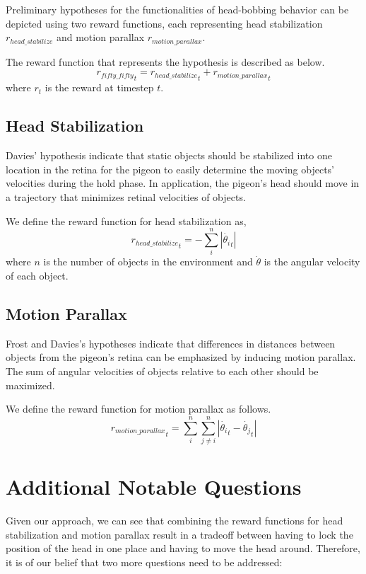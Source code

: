   Preliminary hypotheses for the functionalities of head-bobbing behavior can be depicted using two reward functions, each representing head stabilization ${r_{head\_stabilize}}$ and motion parallax ${r_{motion\_parallax}}$.

  The reward function that represents the hypothesis is described as below.
  \begin{equation}
    {r_{fifty\_fifty}}_t = {r_{head\_stabilize}}_t + {r_{motion\_parallax}}_t
  \end{equation}
  where $r_t$ is the reward at timestep $t$.

  \subsection{Head Stabilization}
    Davies' hypothesis indicate that static objects should be stabilized into one location in the retina for the pigeon to easily determine the moving objects' velocities during the hold phase. In application, the pigeon's head should move in a trajectory that minimizes retinal velocities of objects.

    We define the reward function for head stabilization as,
    \begin{equation}
      {r_{head\_stabilize}}_t = - \sum_i^n |\dot {\theta_i}_t|
    \end{equation}
    where $n$ is the number of objects in the environment and $\dot \theta$ is the angular velocity of each object.

  \subsection{Motion Parallax}
    Frost and Davies's hypotheses indicate that differences in distances between objects from the pigeon's retina can be emphasized by inducing motion parallax.
    The sum of angular velocities of objects relative to each other should be maximized.

    We define the reward function for motion parallax as follows.
    \begin{equation}
      {r_{motion\_parallax}}_t = \sum_i^n \sum_{j \ne i}^n |\dot {\theta_i}_t - \dot {\theta_j}_t|
    \end{equation}


\section{Additional Notable Questions}
  Given our approach, we can see that combining the reward functions for head stabilization and motion parallax result in a tradeoff between having to lock the position of the head in one place and having to move the head around. Therefore, it is of our belief that two more questions need to be addressed:

